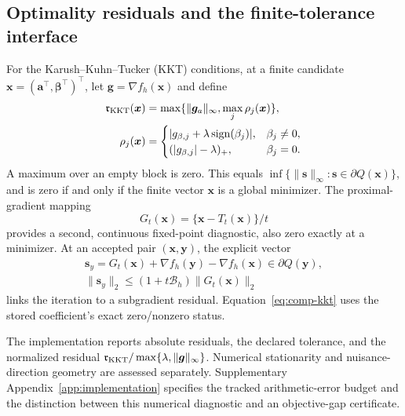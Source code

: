 \subsection{Optimality residuals and the finite-tolerance interface}
\label{subsec:comp-stopping}
For the Karush--Kuhn--Tucker (KKT) conditions, at a finite candidate $\bm{x}=(\bm{a}^\top,\bm{\beta}^\top)^\top$, let $\bm{g}=\nabla f_h(\bm{x})$ and define
\begin{equation}
 \begin{split}
 \mathfrak r_{\rm KKT}(\bm{x})&=\max\{\|\bm{g}_a\|_\infty,\max_j\rho_j(\bm{x})\},\\
 \rho_j(\bm{x})&=
 \begin{cases}
 |g_{\beta,j}+\lambda\operatorname{sign}(\beta_j)|,&\beta_j\ne0,\\
 (|g_{\beta,j}|-\lambda)_+,&\beta_j=0.
 \end{cases}
 \end{split}
 \label{eq:comp-kkt}
\end{equation}
A maximum over an empty block is zero. This equals $\inf\{\|\bm{s}\|_\infty:\bm{s}\in\partial Q(\bm{x})\}$, and is zero if and only if the finite vector $\bm{x}$ is a global minimizer. The proximal-gradient mapping
\begin{equation}
 G_t(\bm{x})=\{\bm{x}-T_t(\bm{x})\}/t
 \label{eq:comp-mapping}
\end{equation}
provides a second, continuous fixed-point diagnostic, also zero exactly at a minimizer. At an accepted pair $(\bm{x},\bm{y})$, the explicit vector
\begin{equation}
 \begin{gathered}
\bm{s}_y=G_t(\bm{x})+\nabla f_h(\bm{y})-\nabla f_h(\bm{x})\in\partial Q(\bm{y}),\\
 \|\bm{s}_y\|_2\le(1+t\mathscr B_h)\|G_t(\bm{x})\|_2
 \end{gathered}
 \label{eq:comp-residual-vector}
\end{equation}
links the iteration to a subgradient residual. Equation~\eqref{eq:comp-kkt} uses the stored coefficient's exact zero/nonzero status.

The implementation reports absolute residuals, the declared tolerance, and the normalized residual $\mathfrak r_{\rm KKT}/\max\{\lambda,\|\bm{g}\|_\infty\}$. Numerical stationarity and nuisance-direction geometry are assessed separately. Supplementary Appendix~\ref{app:implementation} specifies the tracked arithmetic-error budget and the distinction between this numerical diagnostic and an objective-gap certificate.

